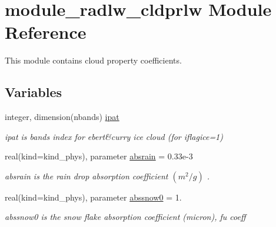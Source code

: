 \hypertarget{namespacemodule__radlw__cldprlw}{}\section{module\+\_\+radlw\+\_\+cldprlw Module Reference}
\label{namespacemodule__radlw__cldprlw}


This module contains cloud property coefficients.  


\subsection*{Variables}
\begin{DoxyCompactItemize}
\item 
\mbox{\label{namespacemodule__radlw__cldprlw_a9e8ebd81d5d62c2be4c006a595493aed}} 
integer, dimension(nbands) \hyperlink{namespacemodule__radlw__cldprlw_a9e8ebd81d5d62c2be4c006a595493aed}{ipat}
\begin{DoxyCompactList}\small\item\em ipat is bands index for ebert\&curry ice cloud (for iflagice=1) \end{DoxyCompactList}\item 
\mbox{\label{namespacemodule__radlw__cldprlw_a04bff194fec27e0586ab1b4770319882}} 
real(kind=kind\+\_\+phys), parameter \hyperlink{namespacemodule__radlw__cldprlw_a04bff194fec27e0586ab1b4770319882}{absrain} = 0.\+33e-\/3
\begin{DoxyCompactList}\small\item\em absrain is the rain drop absorption coefficient $(m^{2}/g)$ . \end{DoxyCompactList}\item 
\mbox{\label{namespacemodule__radlw__cldprlw_a4bcd58c6a7e9abdfbb8f8ec7d925d143}} 
real(kind=kind\+\_\+phys), parameter \hyperlink{namespacemodule__radlw__cldprlw_a4bcd58c6a7e9abdfbb8f8ec7d925d143}{abssnow0} = 1.
\begin{DoxyCompactList}\small\item\em abssnow0 is the snow flake absorption coefficient (micron), fu coeff \end{DoxyCompactList}\item 
\mbox{\label{namespacemodule__radlw__cldprlw_a7d12b328d9dec0c525a4b0824ae7ab44}} 

\end{DoxyCompactItemize}
